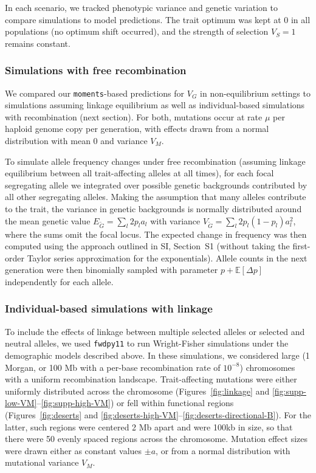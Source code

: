 \documentclass[10pt,letterpaper]{article}
\newcommand{\E}{\mathbb{E}}
\newcommand{\moments}{\texttt{moments}\xspace}
\newcommand{\fwdpy}{\texttt{fwdpy11}\xspace}
\begin{document}
In each scenario, we tracked phenotypic variance and genetic variation to
compare simulations to model predictions. The trait optimum was kept at $0$ in
all populations (no optimum shift occurred), and the strength of selection
$V_S=1$ remains constant.


\subsubsection*{Simulations with free recombination}

We compared our \moments-based predictions for $V_G$ in non-equilibrium
settings to simulations assuming linkage equilibrium as well as
individual-based simulations with recombination (next section). For both,
mutations occur at rate $\mu$ per haploid genome copy per generation, with
effects drawn from a normal distribution with mean 0 and variance $V_M$.

To simulate allele frequency changes under free recombination (assuming linkage
equilibrium between all trait-affecting alleles at all times), for each focal
segregating allele we integrated over possible genetic backgrounds contributed
by all other segregating alleles. Making the assumption that many alleles
contribute to the trait, the variance in genetic backgrounds is normally
distributed around the mean genetic value $E_{\tilde{G}}=\sum_l 2p_l a_l$ with
variance $V_{\tilde{G}}=\sum_l 2p_l(1-p_l)a_l^2$, where the sums omit the focal
locus. The expected change in frequency was then computed using the approach
outlined in SI, Section~S1 (without taking the
first-order Taylor series approximation for the exponentials). Allele counts in
the next generation were then binomially sampled with parameter $p+\E[\Delta
p]$ independently for each allele.

\subsubsection*{Individual-based simulations with linkage}

To include the effects of linkage between multiple selected alleles or selected
and neutral alleles, we used \fwdpy \cite{thornton2019polygenic} to run
Wright-Fisher simulations under the demographic models described above. In
these simulations, we considered large (1 Morgan, or 100 Mb with a per-base
recombination rate of $10^{-8}$) chromosomes with a uniform recombination
landscape. Trait-affecting mutations were either uniformly distributed across
the chromosome (Figures~\ref{fig:linkage} and
\ref{fig:supp-low-VM}--\ref{fig:supp-high-VM}) or fell within functional
regions (Figures~\ref{fig:deserts} and
\ref{fig:deserts-high-VM}--\ref{fig:deserts-directional-B}). For the latter,
such regions were centered 2 Mb apart and were 100kb in size, so that there
were 50 evenly spaced regions across the chromosome. Mutation effect sizes were
drawn either as constant values $\pm a$, or from a normal distribution with
mutational variance $V_M$.
\end{document}
